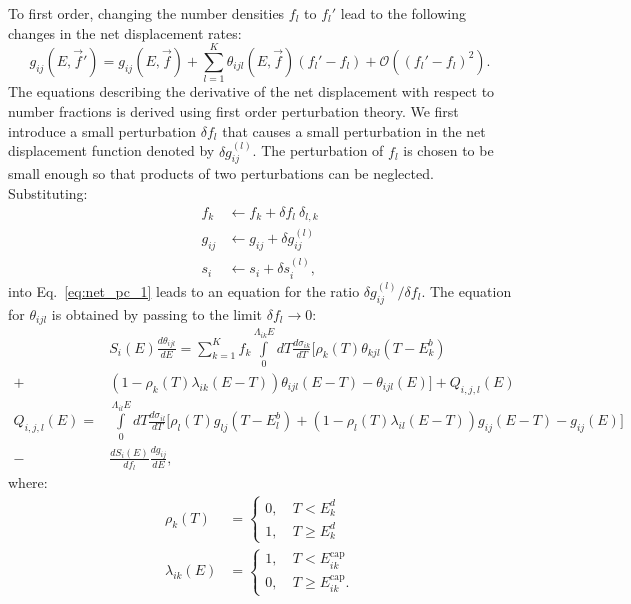 \documentclass[letterpaper]{mandc2019}
\begin{document}
To first order, changing the number densities $f_l$ to $f_l'$ lead to the following changes in the net displacement rates:
\begin{equation}\label{eq:first_order_net}
   g_{ij} (E,\vec{f}') =  g_{ij} (E,\vec{f}) + \sum\limits_{l=1}^K \theta_{ijl}(E,\vec{f}) (f_l' - f_l) + \mathcal{O}((f_l' - f_l)^2).
\end{equation}
The equations describing the derivative of the net displacement with respect to number fractions is derived using first order perturbation theory. We first introduce a small perturbation $\delta f_l$ that causes a small perturbation in the net displacement function denoted by $\delta g_{ij}^{(l)}$. The perturbation of $f_l$ is chosen to be small enough so that products of two perturbations can be neglected. Substituting:
\begin{align}
   f_k & \leftarrow f_k + \delta f_l ~\delta_{l,k} \nonumber \\
    g_{ij} & \leftarrow g_{ij} + \delta g_{ij}^{(l)} \nonumber \\
    s_i & \leftarrow s_i +\delta s_i^{(l)},
\end{align}
into Eq.~\ref{eq:net_pc_1} leads to an equation for the ratio $\delta g_{ij}^{(l)} / \delta f_l$. The equation for $\theta_{ijl}$ is obtained by passing to the limit $\delta f_l \rightarrow 0$:
\begin{align}\label{eq:net_disp_pert_final}
&   S_i(E)\frac{d \theta_{ijl}}{dE}  
   = \sum\limits_{k=1}^K  f_k \int\limits_{0}^{\Lambda_{ik} E} dT \frac{d \sigma_{ik}}{dT} \Bigg [   \rho_k(T) \theta_{kjl}(T-E_k^b)   
 \nonumber \\
 +& (1 - \rho_k(T) \lambda_{ik}(E-T) )  \theta_{ijl}(E-T)  -\theta_{ijl}(E) \Bigg ]  + Q_{i,j,l}(E)\nonumber \\
 Q_{i,j,l}(E)=&  \int\limits_{0}^{\Lambda_{il} E} dT \frac{d \sigma_{il}}{dT} \Bigg [  \rho_l(T) g_{lj}(T-E_l^b) + (1 - \rho_l(T) \lambda_{il}(E-T) ) g_{ij}(E-T)  - g_{ij}(E) \Bigg ] \nonumber \\
 -& \frac{dS_i(E)}{d f_l}  \frac{d g_{ij}}{dE},
\end{align}
where:
\begin{align}
 \rho_k(T) &= \left\{ \begin{array}{ll}
         0, & ~ T < E_k^d\\
         1, & ~ T \ge E_k^d \end{array} \right.  \nonumber \\
 \lambda_{ik}(E) &=  \left\{ \begin{array}{ll}
         1, & ~ T < E_{ik}^{\text{cap}}\\
         0, & ~ T \ge E_{ik}^{\text{cap}} .\end{array} \right.  
\end{align} 
\end{document}
